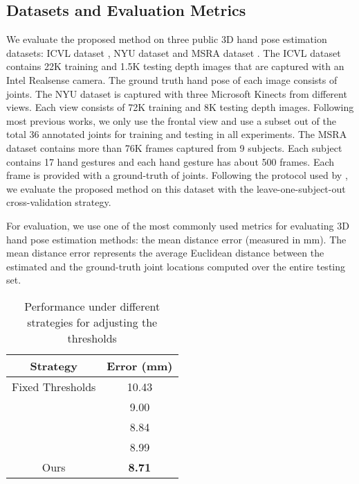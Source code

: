 \documentclass{article}
\begin{document}
\subsection{Datasets and Evaluation Metrics}
We evaluate the proposed method on three public 3D hand pose estimation datasets: ICVL dataset \cite{tang2014latent}, NYU dataset \cite{tompson2014real} and MSRA dataset \cite{sun2015cascaded}. The ICVL dataset contains 22K training and 1.5K testing depth images that are
captured with an Intel Realsense camera. The ground truth hand pose of each image consists of  joints. The NYU dataset is captured with three Microsoft Kinects from different views. Each view consists of 72K training and 8K testing depth images. Following most previous works, we only use the frontal view and use a subset  out of the total 36 annotated joints for training and testing in all experiments. The MSRA dataset \cite{sun2015cascaded} contains more than 76K frames captured from 9 subjects. Each subject contains 17 hand gestures and each hand gesture has about 500 frames. Each frame is provided with a ground-truth of  joints. Following the protocol used by \cite{sun2015cascaded}, we evaluate the proposed method on this dataset with the leave-one-subject-out cross-validation strategy.
\par
For evaluation, we use one of the most commonly used metrics for evaluating 3D hand pose estimation methods: the mean distance error (measured in mm). The mean distance error represents the average Euclidean distance between the estimated and the ground-truth joint locations computed over the entire testing set.


\begin{table}[t]
\caption{Performance under different strategies for adjusting the thresholds}
\centering
\setlength{\tabcolsep}{4pt}
\begin{tabular}{cc}
\hline
                    Strategy                    &   Error (mm)  \\
\hline
        {Fixed Thresholds}               & 10.43 \\
        {}                   & 9.00 \\
      {}                    & 8.84 \\
        {}                   & 8.99 \\

        {Ours}                       &   \textbf{ 8.71} \\

\hline
\end{tabular}
\label{tab:dynamic}
\end{table}
\end{document}
